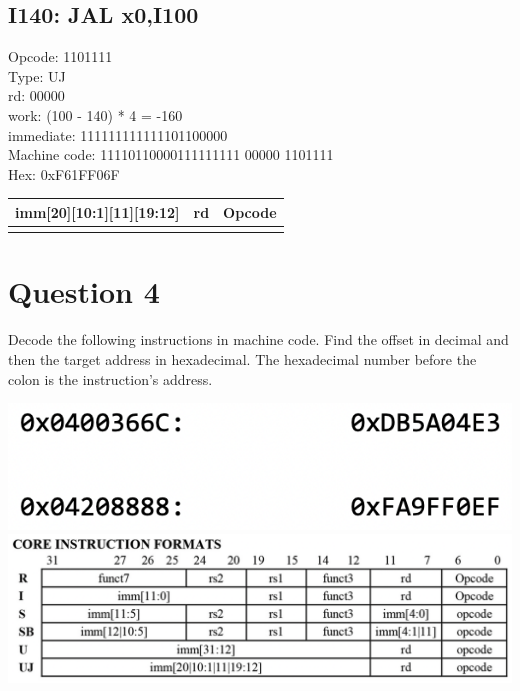 \documentclass{article}
\begin{document}
\subsection*{I140:   JAL x0,I100}

Opcode: 1101111\\
Type: UJ\\
rd: 00000\\
work: (100 - 140) * 4 = -160\\
immediate: 111111111111101100000\\
Machine code: 11110110000111111111 00000 1101111\\
Hex: 0xF61FF06F\\

\begin{center}
    \begin{tabularx}{1.15\textwidth} { 
        | >{\centering\arraybackslash}X 
        | >{\centering\arraybackslash}X 
        | >{\centering\arraybackslash}X | }
       \hline
        imm[20][10:1][11][19:12] & rd & Opcode \\
       \hline
       11110110000111111111 & 00000 & 1101111 \\
      \hline
    \end{tabularx}
\end{center}

\newpage

\section*{Question 4}

Decode the following instructions in machine code. Find the offset in decimal and then the
target address in hexadecimal. The hexadecimal number before the colon is the instruction’s
address.

\begin{center}
    \includegraphics[scale=.75]{images/Q4.png}
    \includegraphics[scale=.3]{images/greencard.png}
\end{center}
\end{document}
